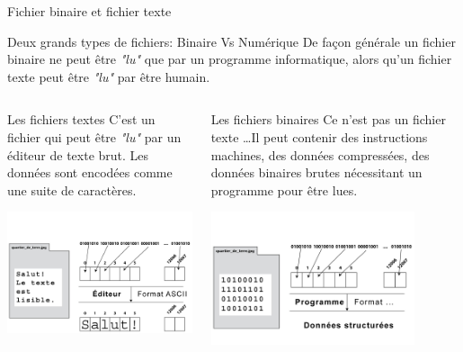 \begin{frame}{Fichier binaire et fichier texte}
  \begin{block}{Deux grands types de fichiers: Binaire Vs Numérique}
    De façon générale un fichier binaire ne peut être \textit{"lu"} que
    par un programme informatique, alors qu'un fichier texte peut être
    \textit{"lu"} par être humain.
  \end{block}
  \begin{columns}
    \begin{column}{6cm}
      \begin{block}{Les fichiers textes}
        C'est un fichier qui peut être \textit{"lu"} par un éditeur de
        texte brut. Les données sont encodées comme une suite de
        caractères.
      \end{block}
      \includegraphics[width=6cm]{img/s03/fichier_1_3.jpg}
    \end{column}
    \begin{column}{6cm}
      \begin{block}{Les fichiers binaires}
        Ce n'est pas un fichier texte \dots Il peut contenir des
        instructions machines, des données compressées, des données
        binaires brutes nécessitant un programme pour être lues.
      \end{block}
      \includegraphics[width=6cm]{img/s03/fichier_1_4.jpg}
    \end{column}
  \end{columns}
\end{frame}
